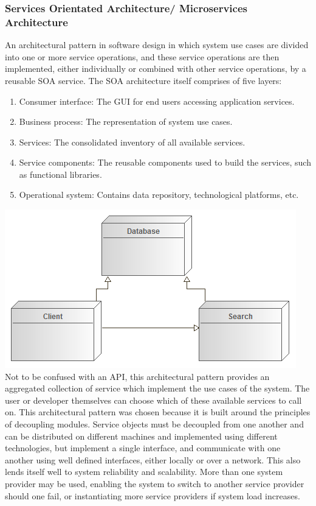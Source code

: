 \documentclass[a4paper,10pt]{article}
\begin{document}
	\subsubsection{Services Orientated Architecture/ Microservices Architecture}
An architectural pattern in software design in which system use cases are divided into one or more service operations, and these service operations are then implemented, either individually or combined with other service operations, by a reusable SOA service. The SOA architecture itself comprises of five layers:
	\begin{enumerate}
		\item Consumer interface: The GUI for end users accessing application services.
		\item Business process: The representation of system use cases.
		\item Services: The consolidated inventory of all available services.
		\item Service components: The reusable components used to build the services, such as functional libraries.
		\item Operational system: Contains data repository, technological platforms, etc.
	\end{enumerate}
 	\includegraphics[scale=0.5]{service_oriented_architecture_diagram.png}\\

Not to be confused with an API, this architectural pattern provides an aggregated collection of service which implement the use cases of the system. The user or developer themselves can choose which of these available services to call on. This architectural pattern was chosen because it is built around the principles of decoupling modules. Service objects must be decoupled from one another and can be distributed on different machines and implemented using different technologies, but implement a single interface, and communicate with one another using well defined interfaces, either locally or over a network. This also lends itself well to system reliability and scalability. More than one system provider may be used, enabling the system to switch to another service provider should one fail, or instantiating more service providers if system load increases.
\end{document}
